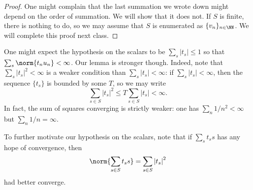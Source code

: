 \documentclass[../notes.tex]{subfiles}
\begin{document}
\begin{proof}
	One might complain that the last summation we wrote down might depend on the order of summation. We will show that it does not. If $S$ is finite, there is nothing to do, so we may assume that $S$ is enumerated as $\{v_n\}_{n\in\NN}$. We will complete this proof next class.
\end{proof}
\begin{remark}
	One might expect the hypothesis on the scalars to be $\sum_s\left|t_s\right|\le1$ so that $\sum_s\norm{t_nu_n}<\infty$. Our lemma is stronger though. Indeed, note that $\sum_s\left|t_s\right|^2<\infty$ is a weaker condition than $\sum_s\left|t_s\right|<\infty$: if $\sum_s\left|t_s\right|<\infty$, then the sequence $\{t_s\}$ is bounded by some $T$, so we may write
	\[\sum_{s\in S}\left|t_s\right|^2\le T\sum_{s\in S}\left|t_s\right|<\infty.\]
	In fact, the sum of squares converging is strictly weaker: one has $\sum_n1/n^2<\infty$ but $\sum_n1/n=\infty$.
\end{remark}
\begin{remark}
	To further motivate our hypothesis on the scalars, note that if $\sum_st_ss$ has any hope of convergence, then
	\[\norm{\sum_{s\in S}t_ss}=\sum_{s\in S}\left|t_s\right|^2\]
	had better converge.
\end{remark}
\end{document}
